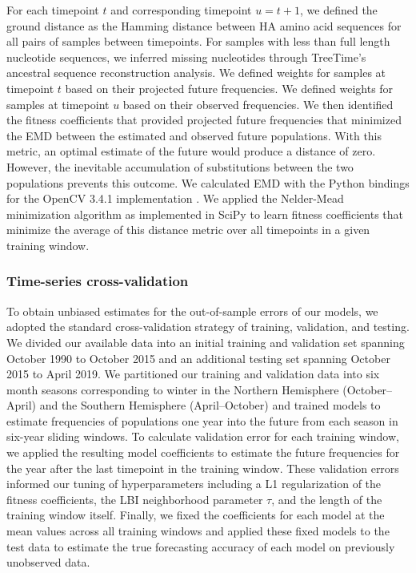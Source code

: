 For each timepoint $t$ and corresponding timepoint $u = t + 1$, we defined the ground distance as the Hamming distance between HA amino acid sequences for all pairs of samples between timepoints.
For samples with less than full length nucleotide sequences, we inferred missing nucleotides through TreeTime's ancestral sequence reconstruction analysis.
We defined weights for samples at timepoint $t$ based on their projected future frequencies.
We defined weights for samples at timepoint $u$ based on their observed frequencies.
We then identified the fitness coefficients that provided projected future frequencies that minimized the EMD between the estimated and observed future populations.
With this metric, an optimal estimate of the future would produce a distance of zero.
However, the inevitable accumulation of substitutions between the two populations prevents this outcome.
We calculated EMD with the Python bindings for the OpenCV 3.4.1 implementation \cite{opencv_library}.
We applied the Nelder-Mead minimization algorithm as implemented in SciPy \cite{SciPy} to learn fitness coefficients that minimize the average of this distance metric over all timepoints in a given training window.

\subsubsection*{Time-series cross-validation}

To obtain unbiased estimates for the out-of-sample errors of our models, we adopted the standard cross-validation strategy of training, validation, and testing.
We divided our available data into an initial training and validation set spanning October 1990 to October 2015 and an additional testing set spanning October 2015 to April 2019.
We partitioned our training and validation data into six month seasons corresponding to winter in the Northern Hemisphere (October--April) and the Southern Hemisphere (April--October) and trained models to estimate frequencies of populations one year into the future from each season in six-year sliding windows.
To calculate validation error for each training window, we applied the resulting model coefficients to estimate the future frequencies for the year after the last timepoint in the training window.
These validation errors informed our tuning of hyperparameters including a L1 regularization of the fitness coefficients, the LBI neighborhood parameter $\tau$, and the length of the training window itself.
Finally, we fixed the coefficients for each model at the mean values across all training windows and applied these fixed models to the test data to estimate the true forecasting accuracy of each model on previously unobserved data.

